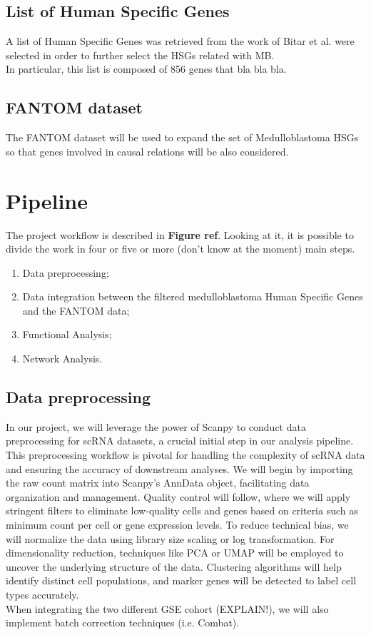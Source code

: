 \documentclass[10pt]{SelfArx} %
\begin{document}
\subsection{List of Human Specific Genes}\label{sec:list_genes}
A list of Human Specific Genes was retrieved from the work of Bitar et al. \cite{bitar2019genes} were selected in order to further select the HSGs related with MB. \\
In particular, this list is composed of 856 genes that  bla bla bla.

\subsection{FANTOM dataset}\label{sec:Fantom_dataset}
The FANTOM \cite{fantom5} dataset will be used to expand the set of Medulloblastoma HSGs so that genes involved in causal relations will be also considered.

\section{Pipeline}\label{sec:pipeline}
The project workflow is described in \textbf{Figure ref}. Looking at it, it is possible to divide the work in four or five or more (don't know at the moment) main steps.

\begin{enumerate}
    \item Data preprocessing;
    \item Data integration between the filtered medulloblastoma Human Specific Genes and the FANTOM data;
    \item Functional Analysis;
    \item Network Analysis.
\end{enumerate}

\subsection{Data preprocessing}\label{sec:pre_processing}
In our project, we will leverage the power of Scanpy \cite{wolf2018scanpy} to conduct data preprocessing for scRNA datasets, a crucial initial step in our analysis pipeline. This preprocessing workflow is pivotal for handling the complexity of scRNA data and ensuring the accuracy of downstream analyses. We will begin by importing the raw count matrix into Scanpy's AnnData object, facilitating data organization and management. Quality control will follow, where we will apply stringent filters to eliminate low-quality cells and genes based on criteria such as minimum count per cell or gene expression levels. To reduce technical bias, we will normalize the data using library size scaling or log transformation. For dimensionality reduction, techniques like PCA or UMAP will be employed to uncover the underlying structure of the data. Clustering algorithms will help identify distinct cell populations, and marker genes will be detected to label cell types accurately. \\
When integrating the two different GSE cohort (EXPLAIN!), we will also implement batch correction techniques (i.e. Combat).
\end{document}
